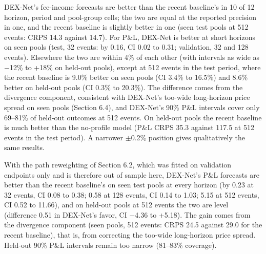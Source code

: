 \documentclass[11pt]{article}
\begin{document}
DEX-Net's fee-income forecasts are better than the recent baseline's in 10 of 12 horizon, period and pool-group cells; the two are equal at the reported precision in one, and the recent baseline is slightly better in one (seen test pools at 512 events: CRPS 14.3 against 14.7). For P\&L, DEX-Net is better at short horizons on seen pools (test, 32 events: by 0.16, CI 0.02 to 0.31; validation, 32 and 128 events). Elsewhere the two are within 4\% of each other (with intervals as wide as \ensuremath{-}12\% to +18\% on held-out pools), except at 512 events in the test period, where the recent baseline is 9.0\% better on seen pools (CI 3.4\% to 16.5\%) and 8.6\% better on held-out pools (CI 0.3\% to 20.3\%). The difference comes from the divergence component, consistent with DEX-Net's too-wide long-horizon price spread on seen pools (Section 6.4), and DEX-Net's 90\% P\&L intervals cover only 69--81\% of held-out outcomes at 512 events. On held-out pools the recent baseline is much better than the no-profile model (P\&L CRPS 35.3 against 117.5 at 512 events in the test period). A narrower \ensuremath{\pm}0.2\% position gives qualitatively the same results.

With the path reweighting of Section 6.2, which was fitted on validation endpoints only and is therefore out of sample here, DEX-Net's P\&L forecasts are better than the recent baseline's on seen test pools at every horizon (by 0.23 at 32 events, CI 0.08 to 0.38; 0.58 at 128 events, CI 0.14 to 1.03; 5.15 at 512 events, CI 0.52 to 11.66), and on held-out pools at 512 events the two are level (difference 0.51 in DEX-Net's favor, CI \ensuremath{-}4.36 to +5.18). The gain comes from the divergence component (seen pools, 512 events: CRPS 24.5 against 29.0 for the recent baseline), that is, from correcting the too-wide long-horizon price spread. Held-out 90\% P\&L intervals remain too narrow (81--83\% coverage).
\end{document}
